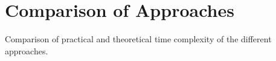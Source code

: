 \section{Comparison of Approaches}

Comparison of practical and theoretical time complexity
of the different approaches.